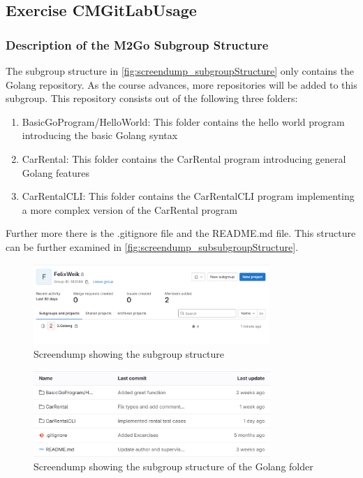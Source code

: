\label{sec:exercise_cm_gitlab_usage}

\subsection{Exercise CMGitLabUsage}

\subsubsection*{Description of the M2Go Subgroup Structure}
The subgroup structure in \autoref{fig:screendump_subgroupStructure} only contains the Golang repository.
As the course advances, more repositories will be added to this subgroup.
This repository consists out of the following three folders:
\begin{enumerate}
    \item BasicGoProgram/HelloWorld: This folder contains the hello world program introducing the basic Golang syntax
    \item CarRental: This folder contains the CarRental program introducing general Golang features
    \item CarRentalCLI: This folder contains the CarRentalCLI program implementing a more complex version of the CarRental program
\end{enumerate}
Further more there is the .gitignore file and the README.md file.
This structure can be further examined in \autoref{fig:screendump_subsubgroupStructure}.

\begin{figure}[h]
    \centering
    \includegraphics[width=0.8\textwidth]{figures/goLang/golang_personalSubgroupStructure.png}
    \caption{Screendump showing the subgroup structure}
    \label{fig:screendump_subgroupStructure}
\end{figure}

\begin{figure}
    \centering
    \includegraphics[width=0.8\textwidth]{figures/goLang/golang_personalSubsubgroupStructure.png}
    \caption{Screendump showing the subgroup structure of the Golang folder}
    \label{fig:screendump_subsubgroupStructure}
\end{figure}

